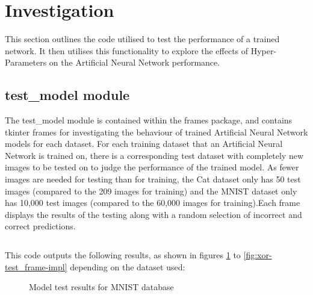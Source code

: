 \documentclass[./project-report/src/latex/project-report.tex]{subfiles}
\begin{document}
\maketitle

\clearpage

\section{Investigation}

This section outlines the code utilised to test the performance of a trained network. It then utilises this functionality to explore the effects of Hyper-Parameters on the 
Artificial Neural Network performance.

\subsection{test\_model module}
\label{sec:test_model-module}

The test\_model module is contained within the frames package, and contains tkinter frames for investigating the behaviour of trained Artificial Neural Network models for 
each dataset. For each training dataset that an Artificial Neural Network is trained on, there is a corresponding test dataset with completely new images to be tested on to 
judge the performance of the trained model. As fewer images are needed for testing than for training, the Cat dataset only has 50 test images (compared to the 209 images for 
training) and the MNIST \cite{wiki_mnist} dataset only has 10,000 test images (compared to the 60,000 images for training).Each frame displays the results of the testing 
along with a random selection of incorrect and correct predictions.

\inputminted{python}{./school_project/frames/test_model.py}

This code outputs the following results, as shown in figures \ref{fig:test-frame-impl} to \ref{fig:xor-test_frame-impl} depending on the dataset used:

\pagebreak

\begin{figure}[h!]
\centering
{}
\caption{Model test results for MNIST database}
\label{fig:test-frame-impl}
\end{figure}
\end{document}

